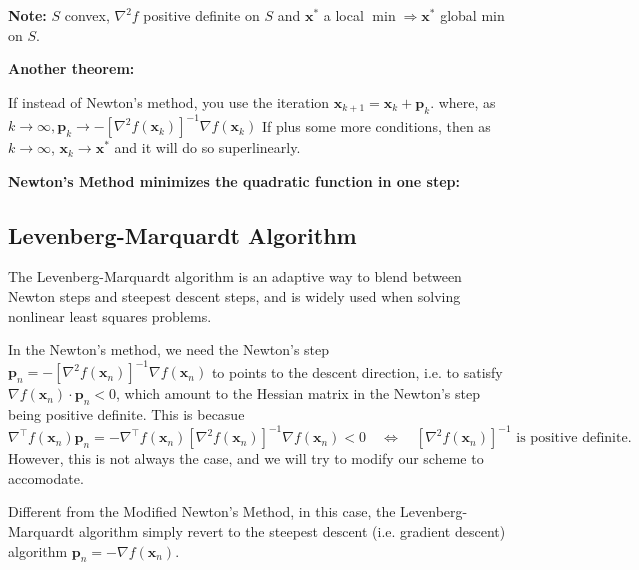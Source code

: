 \documentclass[11pt]{article}
\theoremstyle{plain} %
\newenvironment{topic}
{\color{C2}\normalfont\begin{framed}\begingroup }
  {\endgroup\end{framed}}
\theoremstyle{remark}
\begin{document}
\begin{topic}
  \textbf{Note:} $S$ convex, $\nabla^2 f$ positive definite on $S$ and
  $\mathbf{x}^*$ a local $\min \Rightarrow \mathbf{x}^*$ global min on $S$.


  \textbf{Another theorem:}

  If instead of Newton's method, you use the iteration $\mathbf{x}_{k+1} = \mathbf{x}_k + \mathbf{p}_k$.
  where, as $k \rightarrow \infty, \mathbf{p}_k \longrightarrow -\left[\nabla^2 f(\mathbf{x}_k)\right]^{-1} \nabla f(\mathbf{x}_k)$
  If plus some more conditions, then as $k \rightarrow \infty$,
  $\mathbf{x}_k \rightarrow\mathbf{x}^*$ and it will do so superlinearly.







  \textbf{Newton's Method minimizes the quadratic function in one step:}


\end{topic}


\subsection{Levenberg-Marquardt Algorithm}
\begin{topic}
  The Levenberg-Marquardt algorithm is an adaptive way to blend between Newton
  steps and steepest descent steps, and is widely used when solving nonlinear
  least squares problems.

  In the Newton's method, we need the Newton's step $\mathbf{p}_n = -\left[\nabla^2 f(\mathbf{x}_n)\right]^{-1} \nabla f(\mathbf{x}_n)$
  to points to the descent direction, i.e. to satisfy $\nabla f(\mathbf{x}_n) \cdot \mathbf{p}_n < 0$, which amount to
  the Hessian matrix in the Newton's step being positive definite. This is becasue
  $$
    \nabla^\top f(\mathbf{x}_n) \mathbf{p}_n
    = -\nabla^{\top} f(\mathbf{x}_n)\left[\nabla^2 f(\mathbf{x}_n)\right]^{-1} \nabla f(\mathbf{x}_n) < 0
    \quad \Longleftrightarrow \quad
    \left[\nabla^2 f(\mathbf{x}_n)\right]^{-1} \text{ is positive definite.}
  $$
  However, this is not always the case, and we will try to modify our scheme to
  accomodate.

  Different from the Modified Newton's Method, in this case, the Levenberg-Marquardt algorithm simply revert to
  the steepest descent (i.e. gradient descent) algorithm $\mathbf{p}_n = - \nabla f(\mathbf{x}_n)$.


\end{topic}
\end{document}
